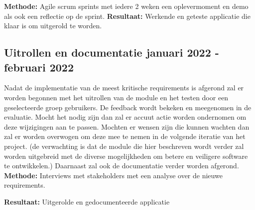 \textbf{Methode:} Agile scrum sprints met iedere 2 weken een oplevermoment en demo als ook een reflectie op de sprint.
\textbf{Resultaat:} Werkende en geteste applicatie die klaar is om uitgerold te worden.

\subsection{Uitrollen en documentatie \textbf{januari 2022 - februari 2022 }}\label{subsec:uitrollen-en-documentatie}
Nadat de implementatie van de meest kritische requirements is afgerond zal er worden begonnen met het uitrollen van de module en het testen door een geselecteerde groep gebruikers. De feedback wordt bekeken en meegenomen in de evaluatie. Mocht het nodig zijn dan zal er accuut actie worden ondernomen om deze wijzigingen aan te passen. Mochten er wensen zijn die kunnen wachten dan zal er worden overwogen om deze mee te nemen in de volgende iteratie van het project. (de verwachting is dat de module die hier beschreven wordt verder zal worden uitgebreid met de diverse mogelijkheden om betere en veiligere software te ontwikkelen.) Daarnaast zal ook de documentatie verder worden afgerond.
\textbf{Methode:} Interviews met stakeholders met een analyse over de nieuwe requirements.

\textbf{Resultaat:} Uitgerolde en gedocumenteerde applicatie
